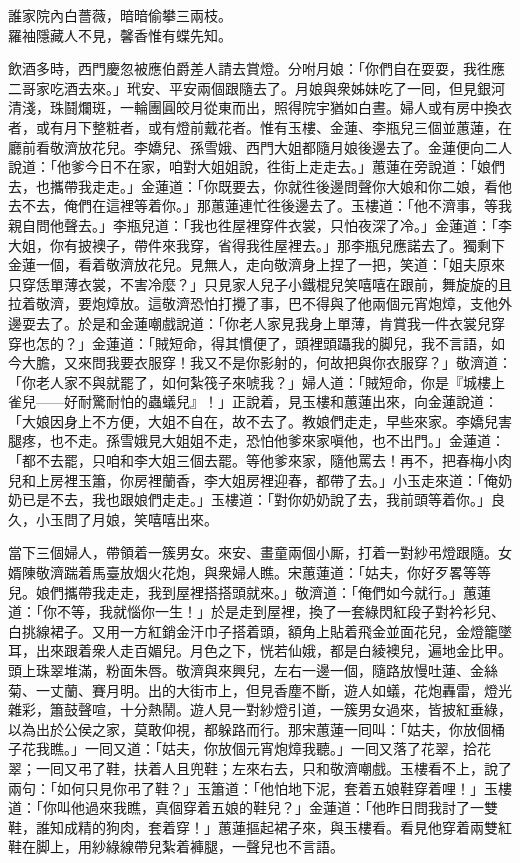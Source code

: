 \begin{myquote} 
誰家院內白薔薇，暗暗偷攀三兩枝。\\羅袖隱藏人不見，馨香惟有蝶先知。
\end{myquote} 

飲酒多時，西門慶忽被應伯爵差人請去賞燈。分咐月娘：「你們自在耍耍，我徃應二哥家吃酒去來。」玳安、平安兩個跟隨去了。月娘與衆姊妹吃了一囘，但見銀河清淺，珠鬪爛斑，一輪團圓皎月從東而出，照得院宇猶如白晝。婦人或有房中換衣者，或有月下整粧者，或有燈前戴花者。惟有玉樓、金蓮、李瓶兒三個並蕙蓮，在廳前看敬濟放花兒。李嬌兒、孫雪娥、西門大姐都隨月娘後邊去了。金蓮便向二人說道：「他爹今日不在家，咱對大姐姐說，徃街上走走去。」蕙蓮在旁說道：「娘們去，也攜帶我走走。」金蓮道：「你既要去，你就徃後邊問聲你大娘和你二娘，看他去不去，俺們在這裡等着你。」那蕙蓮連忙徃後邊去了。玉樓道：「他不濟事，等我親自問他聲去。」李瓶兒道：「我也徃屋裡穿件衣裳，只怕夜深了冷。」金蓮道：「李大姐，你有披襖子，帶件來我穿，省得我徃屋裡去。」{}那李瓶兒應諾去了。{}獨剩下金蓮一個，看着敬濟放花兒。見無人，走向敬濟身上捏了一把，{}笑道：「姐夫原來只穿恁單薄衣裳，不害冷麼？」只見家人兒子小鐵棍兒笑嘻嘻在跟前，舞旋旋的且拉着敬濟，要炮𤍤放。{}這敬濟恐怕打攪了事，巴不得與了他兩個元宵炮𤍤，支他外邊耍去了。於是和金蓮嘲戲說道：「你老人家見我身上單薄，肯賞我一件衣裳兒穿穿也怎的？」金蓮道：「賊短命，得其慣便了，頭裡頭躡我的脚兒，我不言語，如今大膽，又來問我要衣服穿！我又不是你影射的，何故把與你衣服穿？」敬濟道：「你老人家不與就罷了，如何紮筏子來唬我？」婦人道：「賊短命，你是『城樓上雀兒——好耐驚耐怕的蟲蟻兒』！」正說着，見玉樓和蕙蓮出來，向金蓮說道：「大娘因身上不方便，大姐不自在，故不去了。教娘們走走，早些來家。李嬌兒害腿疼，也不走。孫雪娥見大姐姐不走，恐怕他爹來家嗔他，也不出門。」金蓮道：「都不去罷，只咱和李大姐三個去罷。等他爹來家，隨他罵去！再不，把春梅小肉兒和上房裡玉簫，你房裡蘭香，李大姐房裡迎春，都帶了去。」小玉走來道：「俺奶奶已是不去，我也跟娘們走走。」玉樓道：「對你奶奶說了去，我前頭等着你。」良久，小玉問了月娘，笑嘻嘻出來。

當下三個婦人，帶領着一簇男女。來安、畫童兩個小厮，打着一對紗弔燈跟隨。女婿陳敬濟踹着馬臺放烟火花炮，與衆婦人瞧。宋蕙蓮道：「姑夫，你好歹畧等等兒。娘們攜帶我走走，我到屋裡搭搭頭就來。」敬濟道：「俺們如今就行。」蕙蓮道：「你不等，我就惱你一生！」{}於是走到屋裡，換了一套綠閃紅段子對衿衫兒、白挑線裙子。又用一方紅銷金汗巾子搭着頭，額角上貼着飛金並面花兒，金燈籠墜耳，出來跟着衆人走百媚兒。月色之下，恍若仙娥，都是白綾襖兒，遍地金比甲。頭上珠翠堆滿，粉面朱唇。敬濟與來興兒，左右一邊一個，隨路放慢吐蓮、金絲菊、一丈蘭、賽月明。出的大街市上，但見香塵不斷，遊人如蟻，花炮轟雷，燈光雜彩，簫鼓聲喧，十分熱鬧。遊人見一對紗燈引道，一簇男女過來，皆披紅垂綠，以為出於公侯之家，莫敢仰視，都躲路而行。那宋蕙蓮一囘叫：「姑夫，你放個桶子花我瞧。」一囘又道：「姑夫，你放個元宵炮𤍤我聽。」一囘又落了花翠，拾花翠；一囘又弔了鞋，扶着人且兜鞋；左來右去，只和敬濟嘲戲。{}玉樓看不上，說了兩句：「如何只見你弔了鞋？」玉簫道：「他怕地下泥，套着五娘鞋穿着哩！」{}玉樓道：「你叫他過來我瞧，真個穿着五娘的鞋兒？」金蓮道：「他昨日問我討了一雙鞋，誰知成精的狗肉，套着穿！」蕙蓮摳起裙子來，與玉樓看。看見他穿着兩雙紅鞋在脚上，用紗綠線帶兒紮着褲腿，一聲兒也不言語。

